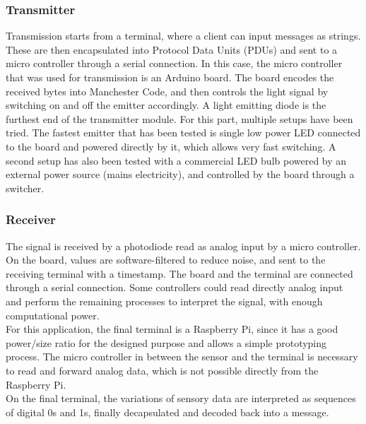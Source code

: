 
\subsubsection{Transmitter}
Transmission starts from a terminal, where a client can input messages as strings. These are then encapsulated into Protocol Data Units (PDUs) and sent to a micro controller through a serial connection.
In this case, the micro controller that was used for transmission is an Arduino board.
The board encodes the received bytes into Manchester Code, and then controls the light signal by switching on and off the emitter accordingly.
A light emitting diode is the furthest end of the transmitter module.
For this part, multiple setups have been tried.
The fastest emitter that has been tested is single low power LED connected to the board and powered directly by it, which allows very fast switching.
A second setup has also been tested with a commercial LED bulb powered by an external power source (mains electricity), and controlled by the board through a switcher. 

\subsubsection{Receiver}
The signal is received by a photodiode read as analog input by a micro controller.
On the board, values are software-filtered to reduce noise, and sent to the receiving terminal with a timestamp.
The board and the terminal are connected through a serial connection.
Some controllers could read directly analog input and perform the remaining processes to interpret the signal, with enough computational power.\\ 
For this application, the final terminal is a Raspberry Pi, since it has a good power/size ratio for the designed purpose and allows a simple prototyping process. The micro controller in between the sensor and the terminal is necessary to read and forward analog data, which is not possible directly from the Raspberry Pi.\\
On the final terminal, the variations of sensory data are interpreted as sequences of digital 0s and 1s, finally decapsulated and decoded back into a message.

